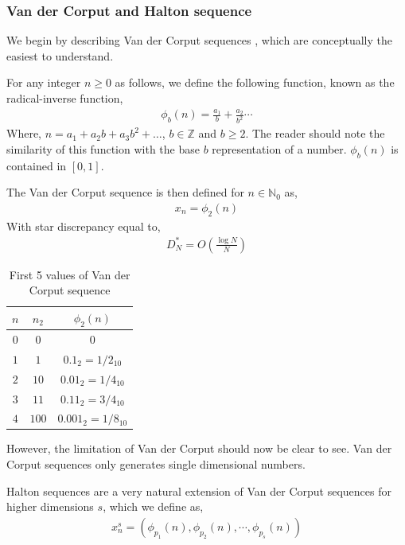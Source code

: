 \documentclass[12pt]{article}
\numberwithin{equation}{section}
\begin{document}
\subsubsection{Van der Corput and Halton sequence}
We begin by describing Van der Corput sequences \cite{kuipers1974uniform, leobacher}, which are conceptually the easiest to understand. 
\par For any integer $n\geq 0$ as follows, we define the following function, known as the radical-inverse function,
\begin{align}
    \phi_b(n)=\frac{a_1}{b}+\frac{a_2}{b^2}\cdots \label{radicalinverse}
\end{align}
Where, $n=a_1+a_2b+a_3b^2+\dots$, $b\in \mathbb{Z}$ and $b \geq 2$. The reader should note the similarity of this function with the base $b$ representation of a number. $\phi_b(n)$ is contained in $[0,1]$.
\par The Van der Corput sequence is then defined for $n\in \mathbb{N}_0$ as,
\begin{align}
    x_n=\phi_2(n)
\end{align}
With star discrepancy equal to,
\begin{align}
    D_N^*= O \left( \frac{\log N}{N}\right)
\end{align}
\begin{table}[h!]
\centering
\begin{tabular}{ccc}
\hline
$n$ & $n_2$ & $\phi_2(n)$ \\ \hline
$0$ & $0$ & $0$ \\
$1$ & $1$ & $0.1_2=1/2_{10}$ \\
$2$ & $10$ & $0.01_2=1/4_{10}$ \\
$3$ & $11$ & $0.11_2=3/4_{10}$ \\
$4$ & $100$ & $0.001_2=1/8_{10}$ \\ \hline
\end{tabular}
\caption{First 5 values of Van der Corput sequence}
\label{tab:vandercorput}
\end{table}
\par However, the limitation of Van der Corput should now be clear to see. Van der Corput sequences only generates single dimensional numbers.
\par Halton sequences \cite{halton} are a very natural extension of Van der Corput sequences for higher dimensions $s$, which we define as,
\begin{align}
    x_n^s=(\phi_{p_1}(n), \phi_{p_2} (n), \cdots,\phi_{p_s}(n))
\end{align}
\end{document}
